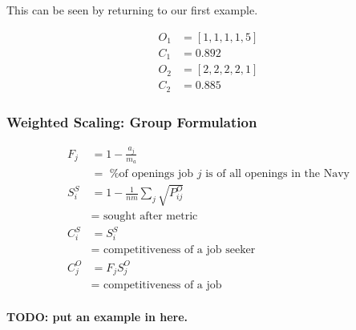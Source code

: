 This can be seen by returning to our first example.

\begin{align}
O_1 &= [1,1,1,1,5] \\
C_1 &= 0.892\\
O_2 &= [2,2,2,2,1] \\
C_2 &= 0.885
\end{align}

\subsubsection{Weighted Scaling: Group Formulation}

\begin{align*}
F_j &= 1 - \frac{a_j}{m_a} \\
&= \text{ \% of openings job $j$ is of all openings in the Navy} \\ 
S^S_i &= 1 - \frac{1}{nm} \sum_j \sqrt{P_{ij}^O} \\
&= \text{ sought after metric} \\
C_i^S &= S^S_i \\
&= \text{ competitiveness of a job seeker} \\
C_j^O &= F_j S^O_j \\
&= \text{ competitiveness of a job} \\
\end{align*}

\textbf{TODO: put an example in here.}
